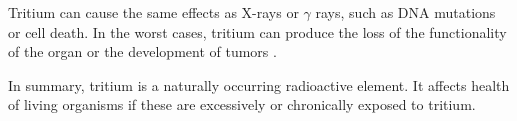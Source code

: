 Tritium can cause the same effects as X-rays or $\gamma$ rays, such as DNA mutations or cell death. In the worst cases, tritium can produce the loss of the functionality of the organ or the development of tumors \cite{StraumeTritiumHazard}. %


In summary, tritium is a naturally occurring radioactive element. It affects health of living organisms if these are excessively or chronically exposed to tritium.



